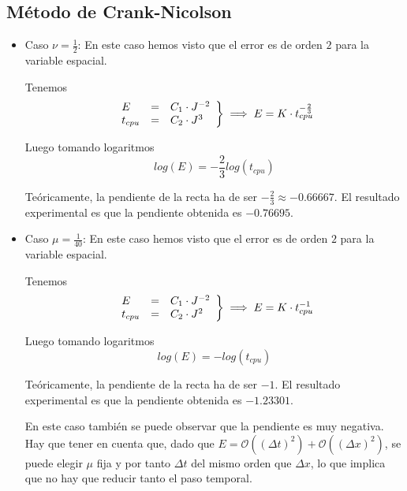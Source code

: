 \documentclass[spanish]{mathnotes}
\begin{document}
	\subsection{Método de Crank-Nicolson}
	\begin{itemize}
		\item Caso $\nu = \frac{1}{2}$: En este caso hemos visto que el error es de orden $2$ para la variable espacial.
		
		Tenemos 
		\begin{equation*}
			\left.
			\begin{array}{l l l}
				E &=& C_1 \cdot J^{-2}\\
				t_{cpu} &=& C_2 \cdot J^3
			\end{array}
			\right\} \implies E = K\cdot  t_{cpu}^{-\frac{2}{3}}
		\end{equation*}
		
		Luego tomando logaritmos
		$$log(E) = -\frac{2}{3}log(t_{cpu})$$
		
		Teóricamente, la pendiente de la recta ha de ser $-\frac{2}{3} \approx -0.66667$. El resultado experimental es que la pendiente obtenida es $-0.76695$.
		
		\item Caso $\mu = \frac{1}{40}$: En este caso hemos visto que el error es de orden $2$ para la variable espacial.
		
		Tenemos 
		\begin{equation*}
			\left.
			\begin{array}{l l l}
				E &=& C_1 \cdot J^{-2}\\
				t_{cpu} &=& C_2 \cdot J^2
			\end{array}
			\right\} \implies E = K\cdot  t_{cpu}^{-1}
		\end{equation*}
		
		Luego tomando logaritmos
		$$log(E) = -log(t_{cpu})$$
		
		Teóricamente, la pendiente de la recta ha de ser $-1$. El resultado experimental es que la pendiente obtenida es $-1.23301$.
		
		En este caso también se puede observar que la pendiente es muy negativa. Hay que tener en cuenta que, dado que $E = \mathcal{O}((\Delta t)^2)+\mathcal{O}((\Delta x)^2)$, se puede elegir $\mu$ fija y por tanto $\Delta t$ del mismo orden que $\Delta x$, lo que implica que no hay que reducir tanto el paso temporal.
	\end{itemize}
	
\end{document}
